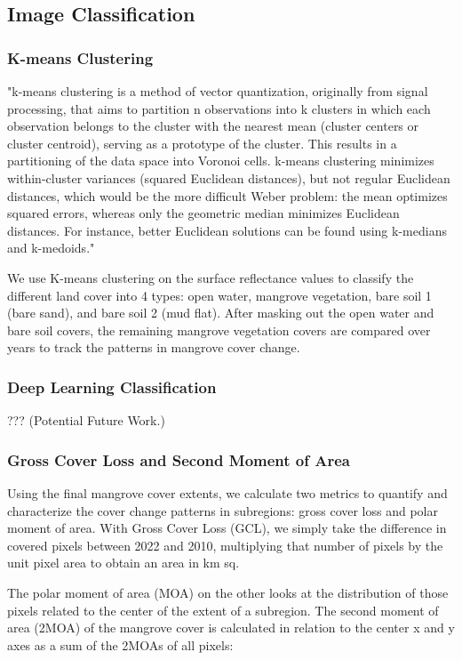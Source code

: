 \documentclass[journal,article,submit,pdftex,moreauthors]{Definitions/mdpi}
\begin{document}
\subsection{Image Classification}
\subsubsection{K-means Clustering}
"k-means clustering is a method of vector quantization, originally from signal processing, that aims to partition n observations into k clusters in which each observation belongs to the cluster with the nearest mean (cluster centers or cluster centroid), serving as a prototype of the cluster. This results in a partitioning of the data space into Voronoi cells. k-means clustering minimizes within-cluster variances (squared Euclidean distances), but not regular Euclidean distances, which would be the more difficult Weber problem: the mean optimizes squared errors, whereas only the geometric median minimizes Euclidean distances. For instance, better Euclidean solutions can be found using k-medians and k-medoids."

We use K-means clustering on the surface reflectance values to classify the different land cover into 4 types: open water, mangrove vegetation, bare soil 1 (bare sand), and bare soil 2 (mud flat). After masking out the open water and bare soil covers, the remaining mangrove vegetation covers are compared over years to track the patterns in mangrove cover change.

\subsubsection{Deep Learning Classification}
??? (Potential Future Work.)
\subsubsection{Gross Cover Loss and Second Moment of Area}
Using the final mangrove cover extents, we calculate two metrics to quantify and characterize the cover change patterns in subregions: gross cover loss and polar moment of area.
With Gross Cover Loss (GCL), we simply take the difference in covered pixels between 2022 and 2010, multiplying that number of pixels by the unit pixel area to obtain an area in km sq. 

The polar moment of area (MOA) on the other looks at the distribution of those pixels related to the center of the extent of a subregion. The second moment of area (2MOA) of the mangrove cover is calculated in relation to the center x and y axes as a sum of the 2MOAs of all pixels:
\end{document}

